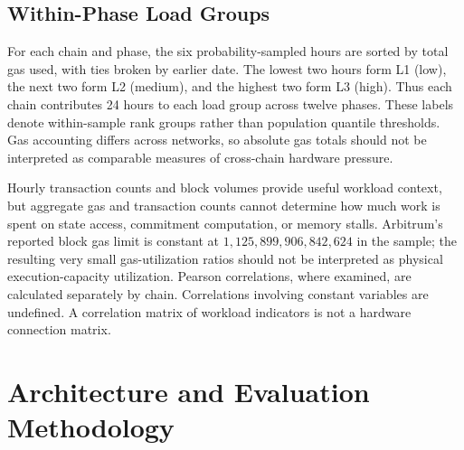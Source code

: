 \documentclass[runningheads]{llncs}
\begin{document}
\subsection{Within-Phase Load Groups}
For each chain and phase, the six probability-sampled hours are sorted by total gas used, with ties broken by earlier date. The lowest two hours form L1 (low), the next two form L2 (medium), and the highest two form L3 (high). Thus each chain contributes 24 hours to each load group across twelve phases. These labels denote within-sample rank groups rather than population quantile thresholds. Gas accounting differs across networks, so absolute gas totals should not be interpreted as comparable measures of cross-chain hardware pressure.

Hourly transaction counts and block volumes provide useful workload context, but aggregate gas and transaction counts cannot determine how much work is spent on state access, commitment computation, or memory stalls. Arbitrum's reported block gas limit is constant at $1{,}125{,}899{,}906{,}842{,}624$ in the sample; the resulting very small gas-utilization ratios should not be interpreted as physical execution-capacity utilization. Pearson correlations, where examined, are calculated separately by chain. Correlations involving constant variables are undefined. A correlation matrix of workload indicators is not a hardware connection matrix.

\section{Architecture and Evaluation Methodology}
\end{document}
